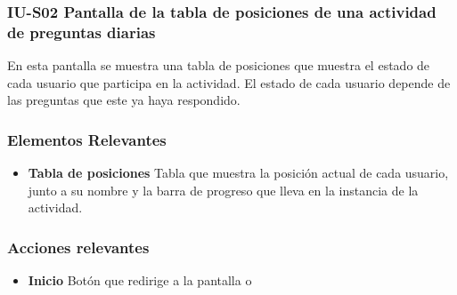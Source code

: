 
\subsubsection{IU-S02  Pantalla de la tabla de posiciones de una actividad de preguntas diarias}

 En esta pantalla se muestra una tabla de posiciones que muestra el estado de cada usuario que participa en la actividad.
 El estado de cada usuario depende de las preguntas que este ya haya respondido.


\subsubsection{Elementos Relevantes}

    \begin{itemize}
    \item {\bf Tabla de posiciones}
        Tabla que muestra la posición actual de cada usuario, junto a su nombre y la barra de progreso que lleva en la instancia de la actividad.
    \end{itemize}

\subsubsection{Acciones relevantes}

    \begin{itemize}
    \item {\bf Inicio}
        Botón que redirige a la pantalla  o 
    \end{itemize}

\clearpage

